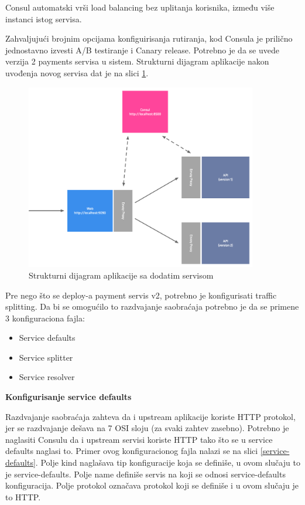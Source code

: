 \documentclass[a4paper,12pt]{report}
\begin{document}
Consul automatski vrši load balancing bez uplitanja korisnika, između više instanci istog servisa. \newline

Zahvaljujući brojnim opcijama konfiguirisanja rutiranja, kod Consula je prilično jednostavno izvesti A/B testiranje i Canary release. Potrebno je da se uvede verzija 2 payments servisa u sistem. Strukturni dijagram aplikacije nakon uvođenja novog servisa dat je na slici \ref{fig:structure-diagram-v2}. \newline

\begin{figure}[h]
    \centering
    \includegraphics[width=0.9\textwidth]{app_structure_diagram}
    \caption{Strukturni dijagram aplikacije sa dodatim servisom}
    \label{fig:structure-diagram-v2}
\end{figure} 

Pre nego što se deploy-a payment servis v2, potrebno je konfigurisati traffic splitting. Da bi se omogućilo to razdvajanje saobraćaja potrebno je da se primene 3 konfiguraciona fajla: 

\begin{itemize}
	\item Service defaults
	\item Service splitter 
	\item Service resolver
\end{itemize}

\textbf{Konfigurisanje service defaults}\newline

Razdvajanje saobraćaja zahteva da i upstream aplikacije koriste HTTP protokol, jer se razdvajanje dešava na 7 OSI sloju (za svaki zahtev zasebno). Potrebno je naglasiti Consulu da i upstream servisi koriste HTTP tako što se u service defaults naglasi to. Primer ovog konfiguracionog fajla nalazi se na slici \ref{service-defaults}. Polje kind naglašava tip konfiguracije koja se definiše, u ovom slučaju to je service-defaults. Polje name definiše servis na koji se odnosi service-defaults konfiguracija. Polje protokol označava protokol koji se definiše i u ovom slučaju je to HTTP. \newline
\end{document}
